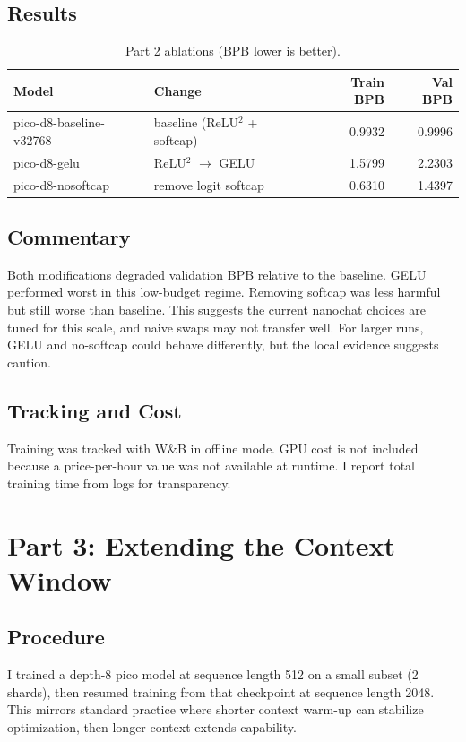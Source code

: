 \documentclass[11pt]{article}
\begin{document}
\subsection*{Results}
\begin{table}[h]
\centering
\begin{tabular}{l l r r}
\toprule
\textbf{Model} & \textbf{Change} & \textbf{Train BPB} & \textbf{Val BPB} \\
\midrule
pico-d8-baseline-v32768 & baseline (ReLU$^2$ + softcap) & 0.9932 & 0.9996 \\
pico-d8-gelu & ReLU$^2$ $\rightarrow$ GELU & 1.5799 & 2.2303 \\
pico-d8-nosoftcap & remove logit softcap & 0.6310 & 1.4397 \\
\bottomrule
\end{tabular}
\caption{Part 2 ablations (BPB lower is better).}
\end{table}

\subsection*{Commentary}
Both modifications degraded validation BPB relative to the baseline. GELU performed worst in this low-budget regime. Removing softcap was less harmful but still worse than baseline. This suggests the current nanochat choices are tuned for this scale, and naive swaps may not transfer well. For larger runs, GELU and no-softcap could behave differently, but the local evidence suggests caution.

\subsection*{Tracking and Cost}
Training was tracked with W\&B in offline mode. GPU cost is not included because a price-per-hour value was not available at runtime. I report total training time from logs for transparency.

\section*{Part 3: Extending the Context Window}

\subsection*{Procedure}
I trained a depth-8 pico model at sequence length 512 on a small subset (2 shards), then resumed training from that checkpoint at sequence length 2048. This mirrors standard practice where shorter context warm-up can stabilize optimization, then longer context extends capability.
\end{document}
